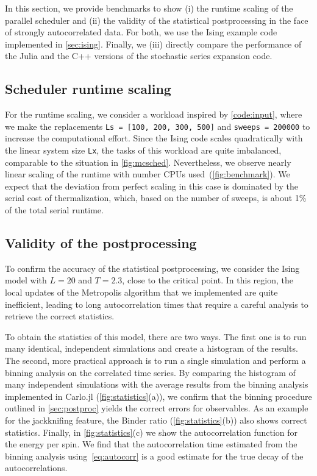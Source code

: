 \documentclass{SciPost}
\begin{document}
In this section, we provide benchmarks to show (i) the runtime scaling of the parallel scheduler and (ii) the validity of the statistical postprocessing in the face of strongly autocorrelated data. For both, we use the Ising example code implemented in \cref{sec:ising}. Finally, we (iii) directly compare the performance of the Julia and the C++ versions of the stochastic series expansion code.

\subsection{Scheduler runtime scaling}
For the runtime scaling, we consider a workload inspired by \cref{code:input}, where we make the replacements \texttt{Ls = [100, 200, 300, 500]} and \texttt{sweeps = 200000} to increase the computational effort. Since the Ising code scales quadratically with the linear system size \texttt{Lx}, the tasks of this workload are quite imbalanced, comparable to the situation in \cref{fig:mcsched}. Nevertheless, we observe nearly linear scaling of the runtime with number CPUs used~(\cref{fig:benchmark}). We expect that the deviation from perfect scaling in this case is dominated by the serial cost of thermalization, which, based on the number of sweeps, is about 1\% of the total serial runtime.

\subsection{Validity of the postprocessing}
To confirm the accuracy of the statistical postprocessing, we consider the Ising model with $L=20$ and $T=2.3$, close to the critical point. In this region, the local updates of the Metropolis algorithm that we implemented are quite inefficient, leading to long autocorrelation times that require a careful analysis to retrieve the correct statistics.

To obtain the statistics of this model, there are two ways. The first one is to run many identical, independent simulations and create a histogram of the results. The second, more practical approach is to run a single simulation and perform a binning analysis on the correlated time series. By comparing the histogram of many independent simulations with the average results from the binning analysis implemented in Carlo.jl (\cref{fig:statistics}(a)), we confirm that the binning procedure outlined in \cref{sec:postproc} yields the correct errors for observables. As an example for the jackknifing feature, the Binder ratio (\cref{fig:statistics}(b)) also shows correct statistics. Finally, in \cref{fig:statistics}(c) we show the autocorrelation function for the energy per spin. We find that the autocorrelation time estimated from the binning analysis using~\cref{eq:autocorr} is a good estimate for the true decay of the autocorrelations.
\end{document}
